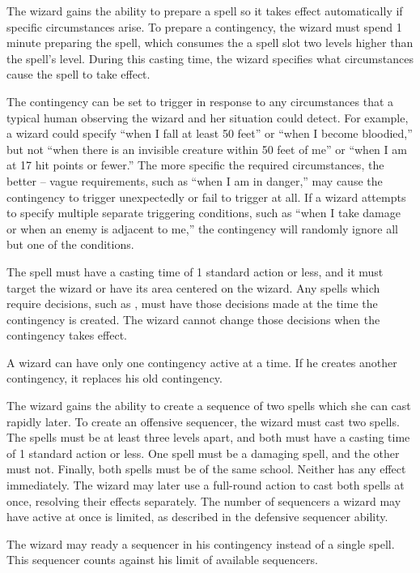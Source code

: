  The wizard gains the ability to prepare a spell so it takes effect automatically if specific circumstances arise. To prepare a contingency, the wizard must spend 1 minute preparing the spell, which consumes the a spell slot two levels higher than the spell's level. During this casting time, the wizard specifies what circumstances cause the spell to take effect.

The contingency can be set to trigger in response to any circumstances that a typical human observing the wizard and her situation could detect. For example, a wizard could specify ``when I fall at least 50 feet'' or ``when I become bloodied,'' but not ``when there is an invisible creature within 50 feet of me'' or ``when I am at 17 hit points or fewer.'' The more specific the required circumstances, the better -- vague requirements, such as ``when I am in danger,'' may cause the contingency to trigger unexpectedly or fail to trigger at all. If a wizard attempts to specify multiple separate triggering conditions, such as ``when I take damage or when an enemy is adjacent to me,'' the contingency will randomly ignore all but one of the conditions.

The spell must have a casting time of 1 standard action or less, and it must target the wizard or have its area centered on the wizard. Any spells which require decisions, such as , must have those decisions made at the time the contingency is created. The wizard cannot change those decisions when the contingency takes effect.

A wizard can have only one contingency active at a time. If he creates another contingency, it replaces his old contingency.

 The wizard gains the ability to create a sequence of two spells which she can cast rapidly later. To create an offensive sequencer, the wizard must cast two spells. The spells must be at least three levels apart, and both must have a casting time of 1 standard action or less. One spell must be a damaging spell, and the other must not. Finally, both spells must be of the same school. Neither has any effect immediately. The wizard may later use a full-round action to cast both spells at once, resolving their effects separately. The number of sequencers a wizard may have active at once is limited, as described in the defensive sequencer ability.

 The wizard may ready a sequencer in his contingency instead of a single spell. This sequencer counts against his limit of available sequencers.

